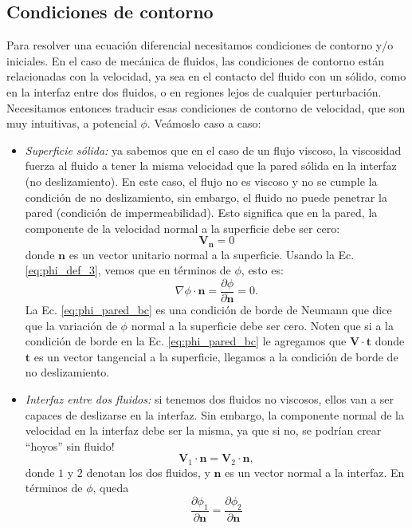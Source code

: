 \subsection*{Condiciones de contorno}
Para resolver una ecuación diferencial necesitamos condiciones de contorno y/o iniciales.
En el caso de mecánica de fluidos, las condiciones de contorno están relacionadas con la velocidad, ya sea en el contacto del fluido con un sólido, como en la interfaz entre dos fluidos, o en regiones lejos de cualquier perturbación. 
Necesitamos entonces traducir esas condiciones de contorno de velocidad, que son muy intuitivas, a potencial $\phi$. 
Veámoslo caso a caso:
%
\begin{itemize}
\item \emph{Superficie sólida:} ya sabemos que en el caso de un flujo viscoso, la viscosidad fuerza al fluido a tener la misma velocidad que la pared sólida en la interfaz (no deslizamiento). 
En este caso, el flujo no es viscoso y no se cumple la condición de no deslizamiento, sin embargo, el fluido no puede penetrar la pared (condición de impermeabilidad).
Esto significa que en la pared, la componente de la velocidad normal a la superficie debe ser cero:
%
\begin{equation}
\mathbf{V}_\mathbf{n} = 0
\end{equation}
%
donde $\mathbf{n}$ es un vector unitario normal a la superficie.
Usando la Ec. \eqref{eq:phi_def_3}, vemos que en términos de $\phi$, esto es:
%
\begin{equation}\label{eq:phi_pared_bc}
\nabla\phi\cdot\mathbf{n} = \frac{\partial\phi}{\partial\mathbf{n}} = 0.
\end{equation}
%
La Ec. \eqref{eq:phi_pared_bc} es una condición de borde de Neumann que dice que la variación de $\phi$ normal a la superficie debe ser cero.
Noten que si a la condición de borde en la Ec. \eqref{eq:phi_pared_bc} le agregamos que $\mathbf{V}\cdot\mathbf{t}$ donde $\mathbf{t}$ es un vector tangencial a la superficie, llegamos a la condición de borde de no deslizamiento.

\item \emph{Interfaz entre dos fluidos:} si tenemos dos fluidos no viscosos, ellos van a ser capaces de deslizarse en la interfaz.
Sin embargo, la componente normal de la velocidad en la interfaz debe ser la misma, ya que si no, se podrían crear ``hoyos'' sin fluido!
%
\begin{equation}
\mathbf{V}_1\cdot\mathbf{n}=\mathbf{V}_2\cdot\mathbf{n},
\end{equation}
%
donde $1$ y $2$ denotan los dos fluidos, y $\mathbf{n}$ es un vector normal a la interfaz.
En términos de $\phi$, queda
%
\begin{equation}
\frac{\partial\phi_1}{\partial\mathbf{n}} = \frac{\partial\phi_2}{\partial\mathbf{n}}
\end{equation}


\end{itemize}
